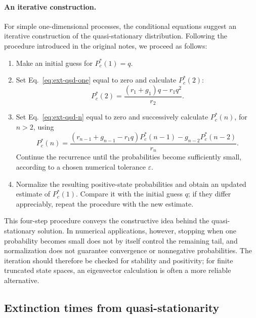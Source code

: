 \paragraph{An iterative construction.}
For simple one-dimensional processes, the conditional equations suggest
an iterative construction of the quasi-stationary distribution. Following
the procedure introduced in the original notes, we proceed as follows:
\begin{enumerate}
\item Make an initial guess for $P_c^*(1)=q$.
\item Set Eq.~\eqref{eq:ext-qsd-one} equal to zero and calculate $P_c^*(2)$:
\begin{equation}
 P_c^*(2)=\frac{(r_1+g_1)q-r_1q^2}{r_2}.
 \label{eq:ext-qsd-pi2}
\end{equation}
\item Set Eq.~\eqref{eq:ext-qsd-n} equal to zero and successively calculate
$P_c^*(n)$, for $n>2$, using
\begin{equation}
 P_c^*(n)=\frac{(r_{n-1}+g_{n-1}-r_1q)P_c^*(n-1)
                   -g_{n-2}P_c^*(n-2)}{r_n}.
 \label{eq:ext-qsd-recursion}
\end{equation}
Continue the recurrence until the probabilities become sufficiently
small, according to a chosen numerical tolerance $\varepsilon$.
\item Normalize the resulting positive-state probabilities and obtain an
updated estimate of $P_c^*(1)$. Compare it with the initial guess $q$;
if they differ appreciably, repeat the procedure with the new estimate.
\end{enumerate}

This four-step procedure conveys the constructive idea behind the
quasi-stationary solution. In numerical applications, however, stopping
when one probability becomes small does not by itself control the
remaining tail, and normalization does not guarantee convergence or
nonnegative probabilities. The iteration should therefore be checked
for stability and positivity; for finite truncated state spaces, an
eigenvector calculation is often a more reliable alternative.

\subsection{Extinction times from quasi-stationarity}
\label{subsec:ext-qsd-time}

